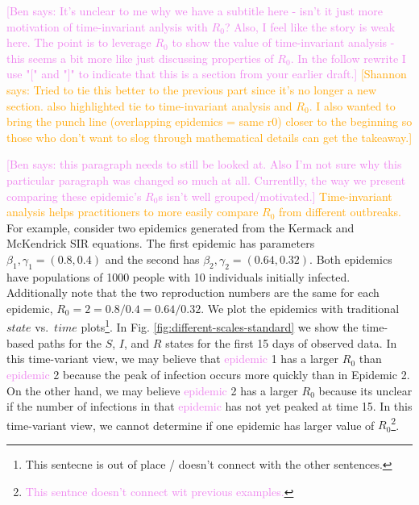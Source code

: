\documentclass[
  shortnames]{jss}
\begin{document}
\textcolor{violet}{[Ben says: It's unclear to me why we have a subtitle here - isn't it just more motivation of time-invariant anlysis with $R_0$? Also, I feel like the story is weak here. The point is to leverage $R_0$ to show the value of time-invariant analysis - this seems a bit more like just discussing properties of $R_0$. In the follow rewrite I use "[" and "]" to indicate that this is a section from your earlier draft.]}
\textcolor{orange}{[Shannon says: Tried to tie this better to the previous part since it's no longer a new section.  also highlighted tie to time-invariant analysis and $R_0$.  I also wanted to bring the punch line (overlapping epidemics = same r0) closer to the beginning so those who don't want to slog through mathematical details can get the takeaway.]}

\textcolor{violet}{[Ben says: this paragraph needs to still be looked at. Also I'm not sure why this particular paragraph was changed so much at all. Currentlly, the way we present comparing these epidemic's $R_0$s isn't well grouped/motivated.]}
\textcolor{orange}{Time-invariant analysis helps practitioners to more easily compare $R_0$ from different outbreaks.}
For example, consider two epidemics generated from the Kermack and
McKendrick SIR equations. The first epidemic has parameters
\(\beta_1, \gamma_1 = (0.8,0.4)\) and the second has
\(\beta_2, \gamma_2 = (0.64,0.32)\). Both epidemics have populations of
1000 people with 10 individuals initially infected. Additionally note
that the two reproduction numbers are the same for each epidemic,
\(R_0 = 2=0.8/0.4 = 0.64/0.32\). We plot the epidemics with traditional
\(state\) vs.~\(time\)
plots\footnote{This sentecne is out of place / doesn't connect with the other sentences.}.
In Fig. \ref{fig:different-scales-standard} we show the time-based paths
for the \(S\), \(I\), and \(R\) states for the first 15 days of observed
data. In this time-variant view, we may believe that
\textcolor{violet}{epidemic} 1 has a larger \(R_0\) than
\textcolor{violet}{epidemic} 2 because the peak of infection occurs more
quickly than in Epidemic 2. On the other hand, we may believe
\textcolor{violet}{epidemic} 2 has a larger \(R_0\) because its unclear
if the number of infections in that \textcolor{violet}{epidemic} has not
yet peaked at time 15. In this time-variant view, we cannot determine if
one epidemic has larger value of
\(R_0\)\footnote{\textcolor{violet}{This sentnce doesn't connect wit previous examples.}}.
\end{document}
